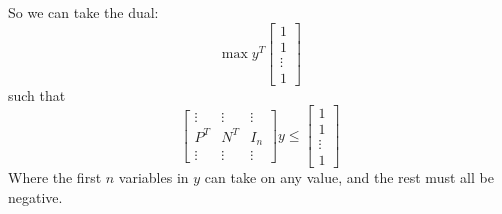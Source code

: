\documentclass[11pt]{article}
\begin{document}
So we can take the dual:
\[ \max y^T \left[ \begin{array}{c} 1 \\ 1 \\ \vdots \\ 1 \end{array} \right] \]
such that
\[ \left[ \begin{array}{ccc} \vdots & \vdots & \vdots \\
					  P^T & N^T & I_n \\
					\vdots & \vdots & \vdots \end{array} \right] y
\leq  \left[ \begin{array}{c} 1 \\ 1 \\ \vdots \\ 1 \end{array} \right] \]
Where the first $n$ variables in $y$ can take on any value, and the rest must all be negative. 
\end{document}
